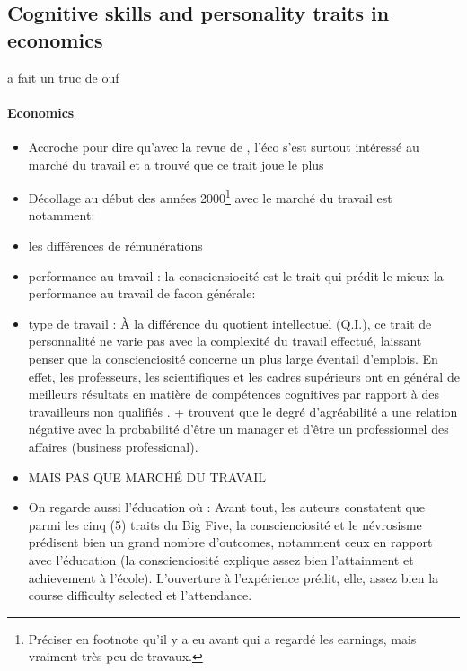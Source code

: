 \documentclass[a4paper, 11pt, onecolumn]{article}
\begin{document}
	\subsection{Cognitive skills and personality traits in economics}

\citep{Almlund2011} a fait un truc de ouf

\paragraph{Economics}
\begin{itemize}
\item Accroche pour dire qu'avec la revue de \citep{Almlund2011}, l'éco s'est surtout intéressé au marché du travail et a trouvé que ce trait joue le plus
\item Décollage au début des années 2000\footnote{Préciser en footnote qu'il y a eu \cite{Bowles1976} avant qui a regardé les earnings, mais vraiment très peu de travaux.} avec le marché du travail est notamment:
\item[1] les différences de rémunérations \citep{Bowles2001} \citep{Heckman2006}  \citep{Cawley2001}
\item[2] performance au travail : la consciensiocité est le trait qui prédit le mieux la performance au travail de facon générale: \citep{Nyhus2005} \citep{Salgado1997} \citep{Hogan2003} \citep{Barrick1991}
\item[3] type de travail : À la différence du quotient intellectuel (Q.I.), ce trait de personnalité ne varie pas avec la complexité du travail effectué, laissant penser que la conscienciosité concerne un plus large éventail d’emplois. En effet, les professeurs, les scientifiques et les cadres supérieurs ont en général de meilleurs résultats en matière de compétences cognitives par rapport à des travailleurs non qualifiés \citep{Schmidt2004} \citep{Almlund2011} \citep{Barrick1991}. + \citep{CobbClark2011} trouvent que le degré d’agréabilité a une relation négative avec la probabilité d’être un manager et d’être un professionnel des affaires (business professional).
\item MAIS PAS QUE MARCHÉ DU TRAVAIL
\item On regarde aussi l'éducation où \cite{Almlund2011} : Avant tout, les auteurs constatent que parmi les cinq (5) traits du Big Five, la conscienciosité et le névrosisme prédisent bien un grand nombre d’outcomes, notamment ceux en rapport avec l’éducation (la conscienciosité explique assez bien l’attainment et achievement à l’école). L’ouverture à l’expérience prédit, elle, assez bien la course difficulty selected et l’attendance. 

\end{itemize}
\end{document}
